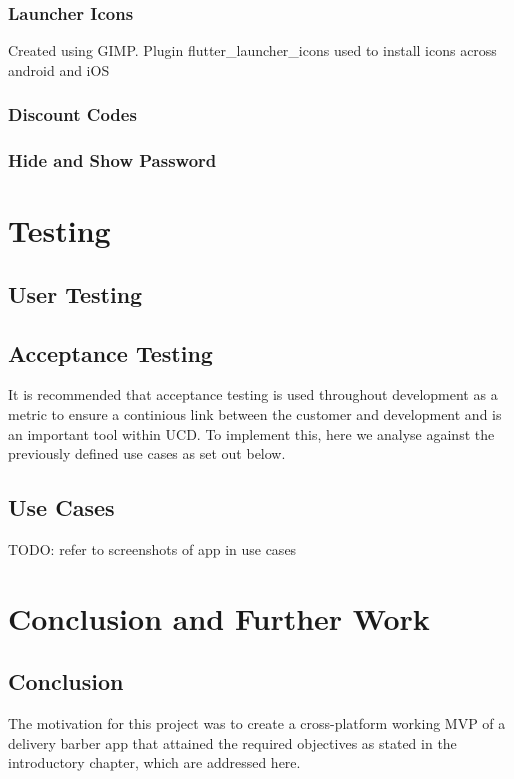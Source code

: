 \documentclass[12pt]{article}
\begin{document}
	\subsubsection{Launcher Icons}
	Created using GIMP. Plugin flutter\_launcher\_icons used to install icons across android and iOS
	
	\subsubsection{Discount Codes}
	
	\subsubsection{Hide and Show Password}
	
	
	
	\section{Testing}
	\label{use-case-implementation}
	\subsection{User Testing}
	\subsection{Acceptance Testing}
	\cite{humbleContinuousDeliveryReliable2010}
	It is recommended that acceptance testing is used throughout development as a metric to ensure a continious link between the customer and development and is an important tool within UCD. To implement this, here we analyse against the previously defined use cases as set out below.
	
	\subsection{Use Cases}
	TODO: refer to screenshots of app in use cases
	
	\section{Conclusion and Further Work}
	\subsection{Conclusion}
	The motivation for this project was to create a cross-platform working MVP of a delivery barber app that attained the required objectives as stated in the introductory chapter, which are addressed here.
	\newline
	
\end{document}
